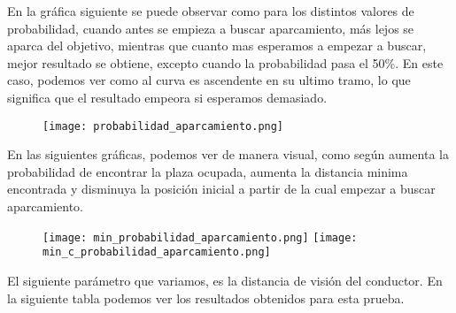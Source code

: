 En la gráfica siguiente se puede observar como para los distintos valores de probabilidad, cuando antes se empieza a buscar aparcamiento, más lejos se aparca del objetivo, mientras que cuanto mas esperamos a empezar a buscar, mejor resultado se obtiene, excepto cuando la probabilidad pasa el 50\%. En este caso, podemos ver como al curva es ascendente en su ultimo tramo, lo que significa que el resultado empeora si esperamos demasiado.

\begin{figure}[h]
\texttt{[image: probabilidad\_aparcamiento.png]}
\centering
\end{figure}

\newpage
En las siguientes gráficas, podemos ver de manera visual, como según aumenta la probabilidad de encontrar la plaza ocupada, aumenta la distancia minima encontrada y disminuya la posición inicial a partir de la cual empezar a buscar aparcamiento.
\begin{figure}[h]
\texttt{[image: min\_probabilidad\_aparcamiento.png]}
\texttt{[image: min\_c\_probabilidad\_aparcamiento.png]}
\centering
\end{figure}

\newpage

El siguiente parámetro que variamos, es la distancia de visión del conductor. En la siguiente tabla podemos ver los resultados obtenidos para esta prueba.

\begin{table}[h]
\centering
{}
\end{table}

